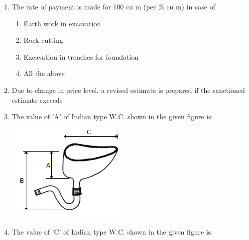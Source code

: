 \documentclass[11pt,a4paper]{article}
\begin{document}
\begin{enumerate}
\\
\item{The rate of payment is made for 100 cu m (per \% cu m) in case of}
\begin{enumerate}[label=\Alph*.]
\item{Earth work in excavation}
\item{Rock cutting}
\item{Excavation in trenches for foundation}
\item{All the above}
\end{enumerate}
\item{Due to change in price level, a revised estimate is prepared if the sanctioned estimate exceeds}
\\
\item{The value of 'A' of Indian type W.C. shown in the given figure is: \\

\includegraphics{../data_img/estimating-and-costing_1525417724-28.png}
}
\\\begin{enumerate*}[itemjoin=\qquad, label=\Alph*.]
\item{25 cm}
\item{30 cm}
\item{40 cm}
\item{45 cm}
\end{enumerate*}
\item{The value of 'C' of Indian type W.C. shown in the given figure is: \\

}
\end{enumerate}
\end{document}
